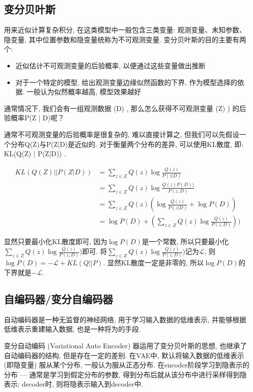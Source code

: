 \subsection{变分贝叶斯}
用来近似计算复杂积分, 在这类模型中一般包含三类变量: 观测变量、未知参数、隐变量, 其中位置参数和隐变量统称为不可观测变量. 变分贝叶斯的目的主要有两个: 
\begin{itemize}
	\item 近似估计不可观测变量的后验概率, 以便通过这些变量做出推断
	\item 对于一个特定的模型, 给出观测变量边缘似然函数的下界, 作为模型选择的依据. 一般认为似然概率越高, 模型效果越好
\end{itemize}
通常情况下, 我们会有一组观测数据 (D) , 那么怎么获得不可观测变量 (Z) ) 的后验概率P(Z | D)呢？

通常不可观测变量的后验概率是很复杂的, 难以直接计算之, 但我们可以先假设一个分布Q(Z)与P(Z|D)是近似的. 对于衡量两个分布的差异, 可以使用KL散度, 即: KL(Q(Z) | P(Z|D)) . 

$$
\begin{equation}\nonumber
	\begin{aligned}
		KL(Q(Z) || P(Z|D)) &= \sum_{z \in Z} Q(z) \log \frac{Q(z)}{P(z|D)} \\
		&= \sum_{z \in Z} Q(z) \log \frac{Q(z) P(D) )}{P(z, D) } \\	
		&= \sum_{z \in Z} Q(z) ( \log \frac{Q(z)}{P(z|D)} + \log P(D) ) \\
		&= \log P(D) + ( \sum_{z \in Z} Q(z) \log \frac{Q(z)}{P(z, D)}) ) 
	\end{aligned}
\end{equation}
$$

显然只要最小化KL散度即可, 因为$\log P(D)$是一个常数, 所以只要最小化$\sum_{z \in Z} Q(z) \log \frac{Q(z)}{P(z, D)})$即可. 将$\sum_{z \in Z} Q(z) \log \frac{Q(z)}{P(z, D)})$记为$\mathcal{L}$, 则$\log P(D) = -\mathcal{L} + KL(Q || P)$. 显然KL散度一定是非零的, 所以$\log P(D)$的下界就是$-\mathcal{L}$. 


\subsection{自编码器/变分自编码器}
自动编码器是一种无监督的神经网络, 用于学习输入数据的低维表示, 并能够根据低维表示重建输入数据, 也是一种将为的手段. 

变分自动编码 (Variational Auto Encoder) 器运用了变分贝叶斯的思想, 也继承了自动编码器的结构, 但是存在一定的差别. 在VAE中, 默认将输入数据的低维表示 (即隐变量) 服从某个分布, 一般认为服从正态分布. 在encoder阶段学习到隐表示的分布 --- 通常是学习到假定分布的参数, 得到分布后就从该分布中进行采样得到隐表示; decoder时, 则将隐表示输入到decoder中. 

